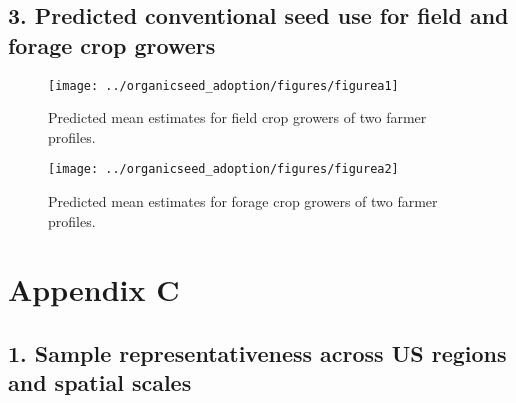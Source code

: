 \documentclass[twoside,12pt,final]{ucthesis-CA2012}
\begin{document}
\begin{ucmainmatter}
{\section{3. Predicted conventional seed use for field and forage crop growers}\label{predicted-conventional-seed-use-for-field-and-forage-crop-growers}}
\begin{figure}

{\centering \texttt{[image: ../organicseed\_adoption/figures/figurea1]} 

}

\caption{Predicted mean estimates for field crop growers of two farmer profiles.}\label{fig:unnamed-chunk-25}
\end{figure}
\begin{figure}

{\centering \texttt{[image: ../organicseed\_adoption/figures/figurea2]} 

}

\caption{Predicted mean estimates for forage crop growers of two farmer profiles.}\label{fig:unnamed-chunk-26}
\end{figure}
\hypertarget{appendix-c}{%
\chapter{Appendix C}\label{appendix-c}}

\hypertarget{sample-representativeness-across-us-regions-and-spatial-scales}{%
\section{1. Sample representativeness across US regions and spatial scales}\label{sample-representativeness-across-us-regions-and-spatial-scales}}
\begin{table}


\end{table}
\end{ucmainmatter}
\end{document}
